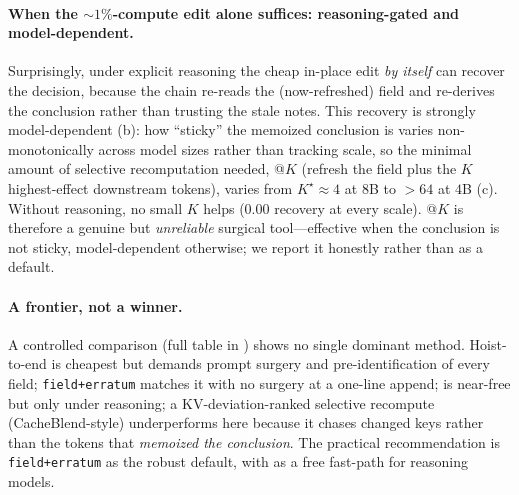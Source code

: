 \paragraph{When the ${\sim}1\%$-compute edit alone suffices: reasoning-gated and model-dependent.}
Surprisingly, under explicit reasoning the cheap in-place edit \emph{by itself} can recover the decision,
because the chain re-reads the (now-refreshed) field and re-derives the conclusion rather than trusting
the stale notes. This recovery is strongly model-dependent (b): how ``sticky'' the memoized
conclusion is varies non-monotonically across model sizes rather than tracking scale, so the minimal
amount of selective recomputation needed, \fieldsel{}@$K$ (refresh the field plus the $K$ highest-effect
downstream tokens), varies from $K^\star\approx 4$ at $8$B to $>64$ at $4$B (c). Without reasoning, no small
$K$ helps ($0.00$ recovery at every scale). \fieldsel{}@$K$ is therefore a genuine but
\emph{unreliable} surgical tool---effective when the conclusion is not sticky, model-dependent otherwise;
we report it honestly rather than as a default.

\paragraph{A frontier, not a winner.} A controlled comparison (full table in ) shows no single
dominant method. Hoist-to-end is cheapest but demands prompt surgery and pre-identification of every field;
\texttt{field+erratum} matches it with no surgery at a one-line append; \inplace{} is near-free but only
under reasoning; a KV-deviation-ranked selective recompute (CacheBlend-style) underperforms here because it
chases changed keys rather than the tokens that \emph{memoized the conclusion}. The practical
recommendation is \texttt{field+erratum} as the robust default, with \inplace{} as a free fast-path for
reasoning models.

